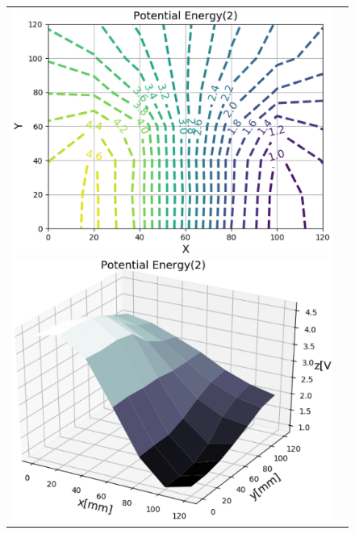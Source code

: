 \documentclass[uplatex,a4paper,11pt,oneside,openany]{jsbook}
\begin{document}
\vfill
\begin{figure}[H]
  \centering
  \begin{tabular}{ll}
      \begin{minipage}{0.5\hsize}
        \centering
        \includegraphics[scale=0.5]{./figure/contr3.eps}
      \end{minipage}
      \begin{minipage}{0.5\hsize}
        \centering
        \includegraphics[scale=0.5]{./figure/contr4.eps}
      \end{minipage}
    \end{tabular}
\end{figure}
\end{document}
